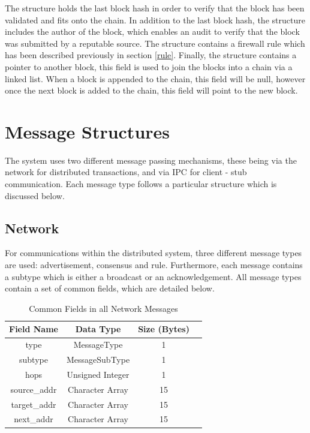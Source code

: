 \documentclass[a4paper, 11pt]{report}
\begin{document}
The structure holds the last block hash in order to verify that the block has been validated and fits onto the chain. In addition to the last block hash, the structure includes the author of the block, which enables an audit to verify that the block was submitted by a reputable source. The structure contains a firewall rule which has been described previously in section \ref{rule}. Finally, the structure contains a pointer to another block, this field is used to join the blocks into a chain via a linked list. When a block is appended to the chain, this field will be null, however once the next block is added to the chain, this field will point to the new block.

\section{Message Structures}
The system uses two different message passing mechanisms, these being via the network for distributed transactions, and via \acrshort{IPC} for client - stub communication. Each message type follows a particular structure which is discussed below.

\subsection{Network} \label{netstruct}
For communications within the distributed system, three different message types are used: advertisement, consensus and rule. Furthermore, each message contains a subtype which is either a broadcast or an acknowledgement. All message types contain a set of common fields, which are detailed below.

\begin{table}[H]
\centering
\begin{tabular}{ |c|c|c|c| } 
\hline
Field Name & Data Type & Size (Bytes) \\
\hline
type & MessageType & 1 \\ 
subtype & MessageSubType & 1 \\ 
hops & Unsigned Integer & 1 \\ 
source_addr & Character Array & 15 \\
target_addr & Character Array & 15 \\
next_addr & Character Array & 15 \\
\hline
\end{tabular}
\caption{Common Fields in all Network Messages}
\label{tab:common}
\end{table}
\end{document}
